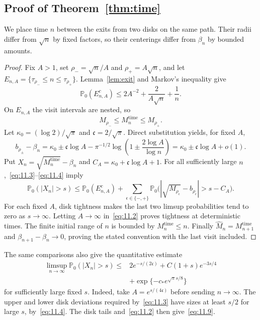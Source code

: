 \documentclass[11pt,letterpaper,reqno]{amsart}
\numberwithin{equation}{section}
\theoremstyle{remark}
\begin{document}
\subsection{Proof of Theorem~\ref{thm:time}}
We place time $n$ between the exits from two disks on the same path. Their radii differ from $\sqrt n$ by fixed factors, so their centerings differ from $\beta_n$ by bounded amounts.
\begin{proof}
Fix $A>1$, set $\rho_-=\sqrt n/A$ and $\rho_+=A\sqrt n$, and let
$E_{n,A}=\{\tau_{\rho_-}\le n\le\tau_{\rho_+}\}$. Lemma~\ref{lem:exit} and Markov's inequality give
\begin{equation}\label{eq:11.2}
\mathbb P_0(E_{n,A}^c)\le2A^{-2}+\frac{2}{A\sqrt n}+\frac1n.
\end{equation}
On $E_{n,A}$ the visit intervals are nested, so
\begin{equation}\label{eq:11.3}
M_{\rho_-}\le M_n^{\mathrm{time}}\le M_{\rho_+}.
\end{equation}
Let $\kappa_0=(\log2)/\sqrt\pi$ and $\mathfrak c=2/\sqrt\pi$. Direct substitution yields, for fixed $A$,
\begin{equation}\label{eq:11.4}
b_{\rho_\pm}-\beta_n
=\kappa_0\pm\mathfrak c\log A
-\pi^{-1/2}\log\left(1\pm\frac{2\log A}{\log n}\right)
=\kappa_0\pm\mathfrak c\log A+o(1).
\end{equation}
Put $X_n=\sqrt{M_n^{\mathrm{time}}}-\beta_n$ and $C_A=\kappa_0+\mathfrak c\log A+1$. For all sufficiently large $n$,~\eqref{eq:11.3}--\eqref{eq:11.4} imply
\[
\mathbb P_0(|X_n|>s)
\le\mathbb P_0(E_{n,A}^c)
+\sum_{\epsilon\in\{-,+\}}
\mathbb P_0\bigl(|\sqrt{M_{\rho_\epsilon}}-b_{\rho_\epsilon}|>s-C_A\bigr).
\]
For each fixed $A$, disk tightness makes the last two limsup probabilities tend to zero as $s\to\infty$. Letting $A\to\infty$ in~\eqref{eq:11.2} proves tightness at deterministic times. The finite initial range of $n$ is bounded by $M_n^{\mathrm{time}}\le n$. Finally $\widehat M_n=M_{n+1}^{\mathrm{time}}$ and $\beta_{n+1}-\beta_n\to0$, proving the stated convention with the last visit included.
\end{proof}

The same comparisons also give the quantitative estimate
\begin{equation}\label{eq:11.9}
\begin{split}
\limsup_{n\to\infty}\mathbb P_0(|X_n|>s)
\le{}&2e^{-s/(2\mathfrak c)}+C(1+s)e^{-3s/4}\\
&+\exp\{-c_*e^{\sqrt\pi s/8}\}
\end{split}
\end{equation}
for sufficiently large fixed $s$. Indeed, take $A=e^{s/(4\mathfrak c)}$ before sending $n\to\infty$. The upper and lower disk deviations required by~\eqref{eq:11.3} have sizes at least $s/2$ for large $s$, by~\eqref{eq:11.4}. The disk tails and~\eqref{eq:11.2} then give~\eqref{eq:11.9}.
\end{document}
